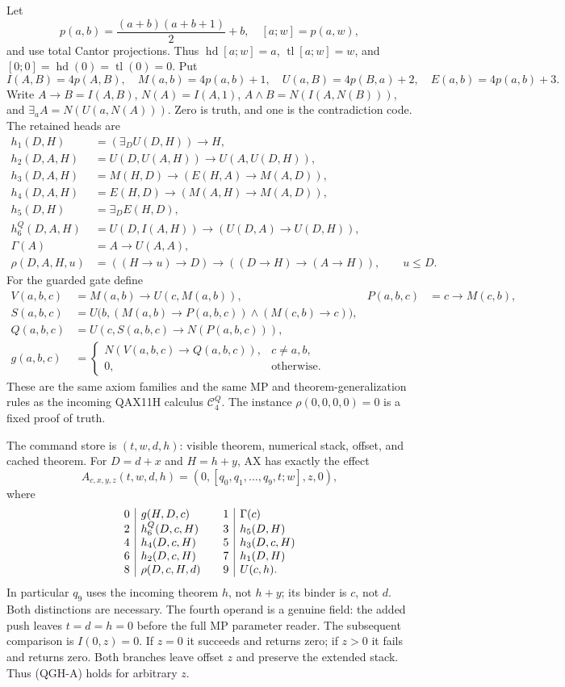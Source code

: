 Let
\[
 p(a,b)=\frac{(a+b)(a+b+1)}2+b,\quad [a;w]=p(a,w),
\]
and use total Cantor projections.  Thus
$\operatorname{hd}[a;w]=a$, $\operatorname{tl}[a;w]=w$, and
$[0;0]=\operatorname{hd}(0)=\operatorname{tl}(0)=0$.
Put
\[
 I(A,B)=4p(A,B),\quad M(a,b)=4p(a,b)+1,\quad
 U(a,B)=4p(B,a)+2,\quad E(a,b)=4p(a,b)+3.
\]
Write $A\to B=I(A,B)$, $N(A)=I(A,1)$,
$A\wedge B=N(I(A,N(B)))$, and $\exists_a A=N(U(a,N(A)))$.
Zero is truth, and one is the contradiction code.  The retained heads are
\begin{align*}
 h_1(D,H)&=(\exists_D U(D,H))\to H,\\
 h_2(D,A,H)&=U(D,U(A,H))\to U(A,U(D,H)),\\
 h_3(D,A,H)&=M(H,D)\to(E(H,A)\to M(A,D)),\\
 h_4(D,A,H)&=E(H,D)\to(M(A,H)\to M(A,D)),\\
 h_5(D,H)&=\exists_D E(H,D),\\
 h_6^Q(D,A,H)&=U(D,I(A,H))\to(U(D,A)\to U(D,H)),\\
 \Gamma(A)&=A\to U(A,A),\\
 \rho(D,A,H,u)&=((H\to u)\to D)\to((D\to H)\to(A\to H)),
 \qquad u\le D.
\end{align*}
For the guarded gate define
\begin{align*}
 V(a,b,c)&=M(a,b)\to U(c,M(a,b)), & P(a,b,c)&=c\to M(c,b),\\
 S(a,b,c)&=U\bigl(b,(M(a,b)\to P(a,b,c))\wedge(M(c,b)\to c)\bigr),\\
 Q(a,b,c)&=U(c,S(a,b,c)\to N(P(a,b,c))),\\
 g(a,b,c)&=\begin{cases}N(V(a,b,c)\to Q(a,b,c)),&c\ne a,b,\\
 0,&\text{otherwise.}\end{cases}
\end{align*}
These are the same axiom families and the same MP and theorem-generalization
rules as the incoming QAX11H calculus $\mathcal C_4^Q$.
The instance $\rho(0,0,0,0)=0$ is a fixed proof of truth.

The command store is $(t,w,d,h)$: visible theorem, numerical stack,
offset, and cached theorem.  For $D=d+x$ and $H=h+y$, AX has exactly
the effect
\begin{equation}
 A_{c,x,y,z}(t,w,d,h)
   =(0,[q_0,q_1,\ldots,q_9,t;w],z,0),
 \tag{QGH-A}
\end{equation}
where
\[
\begin{array}{c|l@{\qquad}c|l}
0&g(H,D,c)&1&\Gamma(c)\\
2&h_6^Q(D,c,H)&3&h_5(D,H)\\
4&h_4(D,c,H)&5&h_3(D,c,H)\\
6&h_2(D,c,H)&7&h_1(D,H)\\
8&\rho(D,c,H,d)&9&U(c,h).
\end{array}
\]
In particular $q_9$ uses the incoming theorem $h$, not $h+y$;
its binder is $c$, not $d$.  Both distinctions are necessary.
The fourth operand is a genuine field: the added push leaves
$t=d=h=0$ before the full MP parameter reader.  The subsequent comparison
is $I(0,z)=0$.  If $z=0$ it succeeds and returns zero; if $z>0$
it fails and returns zero.  Both branches leave offset $z$ and preserve
the extended stack.  Thus (QGH-A) holds for arbitrary $z$.

